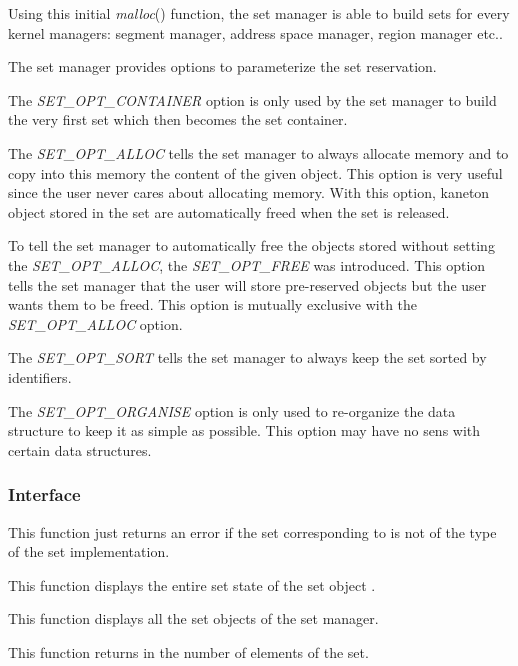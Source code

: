 Using this initial \textit{malloc}() function, the set manager is able to
build sets for every kernel managers: segment manager, address space manager,
region manager etc..

The set manager provides options to parameterize the set reservation.

The \textit{SET\_OPT\_CONTAINER} option is only used by the set manager
to build the very first set which then becomes the set container.

The \textit{SET\_OPT\_ALLOC} tells the set manager to always allocate
memory and to copy into this memory the content of the given object.
This option is very useful since the user never cares about allocating
memory. With this option, kaneton object stored in the set are automatically
freed when the set is released.

To tell the set manager to automatically free the objects stored without
setting the \textit{SET\_OPT\_ALLOC}, the \textit{SET\_OPT\_FREE} was
introduced. This option tells the set manager that the user will store
pre-reserved objects but the user wants them to be freed. This option
is mutually exclusive with the \textit{SET\_OPT\_ALLOC} option.

The \textit{SET\_OPT\_SORT} tells the set manager to always keep the set
sorted by identifiers.

The \textit{SET\_OPT\_ORGANISE} option is only used to re-organize the data
structure to keep it as simple as possible. This option may have no sens
with certain data structures.

%
%

\subsubsection{Interface}

	 {
	   This function just returns an error if the set corresponding
	   to  is not of the type of the set implementation.
	 }

	 {
	   This function displays the entire set state of the set object
	   .
	 }

	 {
	   This function displays all the set objects of the set manager.
	 }

	 {
	   This function returns in  the number of elements
	   of the set.
	 }

